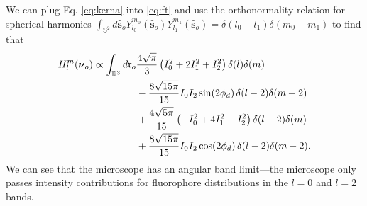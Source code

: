 \documentclass[11pt]{article}
\providecommand{\ro}[1]{\mathbf{\mathfrak{r}}_o}
\providecommand{\so}[1]{\mathbf{\hat{s}}_o}
\providecommand{\bs}[1]{\boldsymbol{#1}}
\begin{document}
We can plug Eq. \ref{eq:kerna} into \ref{eq:ft} and use the orthonormality
relation for spherical harmonics $\int_{\mathbb{S}^2}d\so{} Y_{l_0}^{m_0}(\so{})Y_{l_1}^{m_1}(\so{}) = \delta(l_0 - l_1)\delta(m_0 - m_1)$ to find that
\begin{equation}
  \begin{split}
  H_l^m(\bs{\nu}_o) \propto \int_{\mathbb{R}^3}d\ro{}  &\frac{4\sqrt{\pi}}{3}\left(I_0^2 + 2I_1^2 + I_2^2\right) \delta(l)\delta(m)\\ &-\frac{8\sqrt{15\pi}}{15}I_0I_2\sin(2\phi_d)\thinspace \delta(l-2)\delta(m+2)\\ &+ \frac{4\sqrt{5\pi}}{15}\left(-I_0^2 + 4I_1^2 - I_2^2\right) \delta(l-2)\delta(m)\\ &+\frac{8\sqrt{15\pi}}{15}I_0I_2\cos(2\phi_d) \thinspace \delta(l-2)\delta(m-2).\label{eq:otf}
\end{split}
\end{equation}
We can see that the microscope has an angular band limit---the microscope only
passes intensity contributions for fluorophore distributions in the $l=0$ and
$l=2$ bands.
\end{document}
